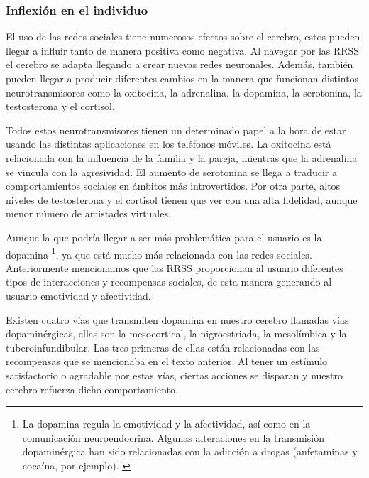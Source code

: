 \subsubsection{Inflexión en el individuo}

El uso de las redes sociales tiene numerosos efectos sobre el cerebro, estos pueden llegar a influir tanto de manera positiva como negativa. Al navegar por las \acs{RRSS} el cerebro se adapta llegando a crear nuevas redes neuronales. \cite{Cerebro-RRSS-AS} Además, también pueden llegar a producir diferentes cambios en la manera que funcionan distintos neurotransmisores como la oxitocina, la adrenalina, la dopamina, la serotonina, la testosterona y el cortisol.

\vspace{0.3cm}

Todos estos neurotransmisores tienen un determinado papel a la hora de estar usando las distintas aplicaciones en los teléfonos móviles. La oxitocina está relacionada con la influencia de la familia y la pareja, mientras que la adrenalina se vincula con la agresividad. El aumento de serotonina se llega a traducir a comportamientos sociales en ámbitos más introvertidos. Por otra parte, altos niveles de testosterona y el cortisol tienen que ver con una alta fidelidad, aunque menor número de amistades virtuales.

\vspace{0.3cm}

Aunque la que podría llegar a ser más problemática para el usuario es la dopamina \footnote{La dopamina regula la emotividad y la afectividad, así como en la comunicación neuroendocrina. Algunas alteraciones en la transmisión dopaminérgica han sido relacionadas con la adicción a drogas (anfetaminas y cocaína, por ejemplo). \cite{bahena2000dopamina}}, ya que está mucho más relacionada con las redes sociales. Anteriormente mencionamos que las \acs{RRSS} proporcionan al usuario diferentes tipos de interacciones y recompensas sociales, de esta manera generando al usuario emotividad y afectividad.

\vspace{0.3cm}

Existen cuatro vías que transmiten dopamina en nuestro cerebro llamadas vías dopaminérgicas, ellas son la mesocortical, la nigroestriada, la mesolímbica y la tuberoinfundibular. Las tres primeras de ellas están relacionadas con las recompensas que se mencionaba en el texto anterior. Al tener un estímulo satisfactorio o agradable por estas vías, ciertas acciones se disparan y nuestro cerebro refuerza dicho comportamiento. \cite{Xataka-RRSS-AS}


